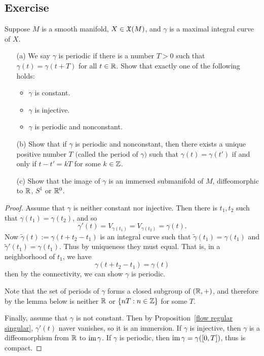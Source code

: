 \subsection{Exercise}
\begin{exercise}
Suppose $M$ is a smooth manifold, $X\in\mathfrak{X}(M)$, and $\gamma$ is a maximal integral curve of $X$.
\begin{itemize}
\item[(a)] We say $\gamma$ is periodic if there is a number $T>0$ such that $\gamma(t)=\gamma(t+T)$ for all $t\in\mathbb{R}$. Show that exactly one of the following holds:
\begin{itemize}
\item $\gamma$ is constant.
\item $\gamma$ is injective.
\item $\gamma$ is periodic and nonconstant.
\end{itemize}
\item[(b)] Show that if $\gamma$ is periodic and nonconstant, then there exists a unique positive number $T$ $($called the period of $\gamma$$)$ such that $\gamma(t)=\gamma(t')$ if and only if $t-t'=kT$ for some $k\in\mathbb{Z}$.
\item[(c)] Show that the image of $\gamma$ is an immersed submanifold of $M$, diffeomorphic to $\mathbb{R}$, $S^1$ or $\mathbb{R}^0$.
\end{itemize}
\end{exercise}
\begin{proof}
Assume that $\gamma$ is neither constant nor injective. Then there is $t_1,t_2$ such that $\gamma(t_1)=\gamma(t_2)$, and so \[\gamma'(t)=V_{\gamma(t_1)}=V_{\gamma(t_2)}=\gamma(t).\]
Now $\widetilde{\gamma}(t):=\gamma(t+t_2-t_1)$ is an integral curve such that $\widetilde{\gamma}(t_1)=\gamma(t_1)$ and $\widetilde{\gamma}'(t_1)=\gamma(t_1)$. Thus by uniqueness they must equal. That is, in a neighborhood of $t_1$, we have
\[\gamma(t+t_2-t_1)=\gamma(t)\]
then by the connectivity, we can show $\gamma$ is periodic.\par
Note that the set of periods of $\gamma$ forms a closed subgroup of $(\mathbb{R},+)$, and therefore by the lemma below is neither $\mathbb{R}$ or $\{nT:n\in\mathbb{Z}\}$ for some $T$.\par
Finally, assume that $\gamma$ is not constant. Then by Proposition~\ref{flow regular singular}, $\gamma'(t)$ naver vanishes, so it is an immersion. If $\gamma$ is injective, then $\gamma$ is a diffeomorphism from $\mathbb{R}$ to $\mathrm{im}\,\gamma$. If $\gamma$ is periodic, then $\mathrm{im}\,\gamma=\gamma([0,T])$, thus is compact.
\end{proof}
